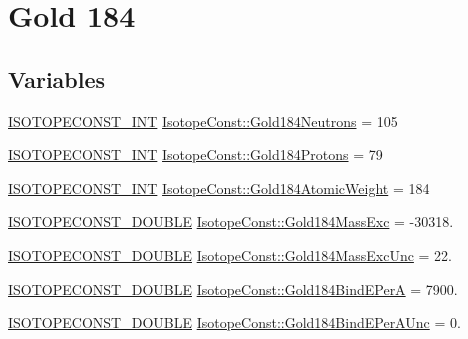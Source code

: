 \hypertarget{group___isotope_const-_gold-_au184}{}\section{Gold 184}
\label{group___isotope_const-_gold-_au184}
\subsection*{Variables}
\begin{DoxyCompactItemize}
\item 
\mbox{\hyperlink{group___isotope_const-_macros_ga5f18360b3e99483a35c32d789e62621c}{I\+S\+O\+T\+O\+P\+E\+C\+O\+N\+S\+T\+\_\+\+I\+NT}} \mbox{\hyperlink{group___isotope_const-_gold-_au184_ga9508ce7a1596417d3f5aa4d55e832c6c}{Isotope\+Const\+::\+Gold184\+Neutrons}} = 105
\item 
\mbox{\hyperlink{group___isotope_const-_macros_ga5f18360b3e99483a35c32d789e62621c}{I\+S\+O\+T\+O\+P\+E\+C\+O\+N\+S\+T\+\_\+\+I\+NT}} \mbox{\hyperlink{group___isotope_const-_gold-_au184_ga745f3d213d7bd05d7e392113d066cb39}{Isotope\+Const\+::\+Gold184\+Protons}} = 79
\item 
\mbox{\hyperlink{group___isotope_const-_macros_ga5f18360b3e99483a35c32d789e62621c}{I\+S\+O\+T\+O\+P\+E\+C\+O\+N\+S\+T\+\_\+\+I\+NT}} \mbox{\hyperlink{group___isotope_const-_gold-_au184_gaec4ff2a824c545744c2e829893c8fcb2}{Isotope\+Const\+::\+Gold184\+Atomic\+Weight}} = 184
\item 
\mbox{\hyperlink{group___isotope_const-_macros_ga8f45a7272ce02c0b4c65c44636ed719a}{I\+S\+O\+T\+O\+P\+E\+C\+O\+N\+S\+T\+\_\+\+D\+O\+U\+B\+LE}} \mbox{\hyperlink{group___isotope_const-_gold-_au184_ga72f5c53d567944b581d55b8eba7b71b2}{Isotope\+Const\+::\+Gold184\+Mass\+Exc}} = -\/30318.
\item 
\mbox{\hyperlink{group___isotope_const-_macros_ga8f45a7272ce02c0b4c65c44636ed719a}{I\+S\+O\+T\+O\+P\+E\+C\+O\+N\+S\+T\+\_\+\+D\+O\+U\+B\+LE}} \mbox{\hyperlink{group___isotope_const-_gold-_au184_ga711d20cfc21babf943c133df440c6e20}{Isotope\+Const\+::\+Gold184\+Mass\+Exc\+Unc}} = 22.
\item 
\mbox{\hyperlink{group___isotope_const-_macros_ga8f45a7272ce02c0b4c65c44636ed719a}{I\+S\+O\+T\+O\+P\+E\+C\+O\+N\+S\+T\+\_\+\+D\+O\+U\+B\+LE}} \mbox{\hyperlink{group___isotope_const-_gold-_au184_ga456ad87a20bae483ec4563655048933d}{Isotope\+Const\+::\+Gold184\+Bind\+E\+PerA}} = 7900.
\item 
\mbox{\hyperlink{group___isotope_const-_macros_ga8f45a7272ce02c0b4c65c44636ed719a}{I\+S\+O\+T\+O\+P\+E\+C\+O\+N\+S\+T\+\_\+\+D\+O\+U\+B\+LE}} \mbox{\hyperlink{group___isotope_const-_gold-_au184_gad727a7a0f7992e190b949532012945fc}{Isotope\+Const\+::\+Gold184\+Bind\+E\+Per\+A\+Unc}} = 0.

\end{DoxyCompactItemize}
